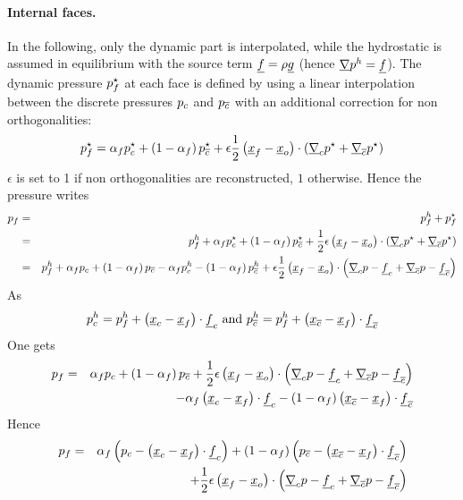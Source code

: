 \paragraph{Internal faces.} In the following, only the dynamic part is
interpolated, while the hydrostatic is assumed in equilibrium with the source
term $\underline{f}=\rho\underline{g}$ (hence $\underline{\nabla} p^h=\underline{f}$). The dynamic pressure
$p_{{f}}^\star$ at each face is defined by using a linear interpolation
between the discrete pressures $p_{c}$ and $p_{{\overline{c}}}$ with an additional
correction for non orthogonalities:
\begin{equation}
	p_{{f}}^\star=\alpha_{{f}}p_{c}^\star+\left(1-\alpha_{{f}}\right)p_{{\overline{c}}}^\star+\epsilon\frac{1}{2}\left(\underline{x}_{{f}}-\underline{x}_o\right)\cdot\left(\underline{\nabla}_{c}{p}^\star+\underline{\nabla}_{{\overline{c}}}{p}^\star\right)
\end{equation}
$\epsilon$ is set to 1 if non orthogonalities are reconstructed, $1$ otherwise.
Hence the pressure writes
\begin{align*}
	p_{{f}}&=&p_{{f}}^{h}+p_{f}^\star \\
	&=&p_{{f}}^{h}+\alpha_{{f}}p_{c}^\star+\left(1-\alpha_{{f}}\right)p_{{\overline{c}}}^\star+\frac{1}{2}\epsilon\left(\underline{x}_{{f}}-\underline{x}_o\right)\cdot\left(\underline{\nabla}_{c}{p}^\star+\underline{\nabla}_{{\overline{c}}}{p}^\star\right) \\
	&=&p_{f}^{h}+\alpha_{{f}}p_{c}+\left(1-\alpha_{{f}}\right)p_{{\overline{c}}}-\alpha_{{f}}p_{c}^{h}-\left(1-\alpha_{{f}}\right)p_{{\overline{c}}}^{h}+\epsilon\frac{1}{2}\left(\underline{x}_{{f}}-\underline{x}_o\right)\cdot\left(\underline{\nabla}_{c}{p}-\underline{f}_{c}+\underline{\nabla}_{{\overline{c}}}{p}-\underline{f}_{{\overline{c}}}\right) \\
\end{align*}
As
\begin{equation}
	p_{c}^{h}=p_{f}^{h}+\left({\underline{x}_{c}}-\underline{x}_{{f}}\right)\cdot\underline{f}_{c} \text{ and }
	p_{{\overline{c}}}^{h}=p_{f}^{h}+\left(\underline{x}_{{\overline{c}}}-\underline{x}_{{f}}\right)\cdot\underline{f}_{{\overline{c}}}
\end{equation}
One gets
\begin{align*}
  p_{f}&=&\alpha_{{f}}p_{c}+\left(1-\alpha_{{f}}\right)p_{{\overline{c}}}+\frac{1}{2}\epsilon\left(\underline{x}_{{f}}-\underline{x}_o\right)\cdot\left(\underline{\nabla}_{c}{p}-\underline{f}_{c}+\underline{\nabla}_{{\overline{c}}}{p}-\underline{f}_{{\overline{c}}}\right) \\ &&-\alpha_{{f}}\left({\underline{x}_{c}}-\underline{x}_{{f}}\right)\cdot\underline{f}_{c}-\left(1-\alpha_{{f}}\right)\left(\underline{x}_{{\overline{c}}}-\underline{x}_{{f}}\right)\cdot\underline{f}_{{\overline{c}}}
\end{align*}
Hence
\begin{align*}
  p_{f}&=&\alpha_{{f}}\left(p_{c}-\left({\underline{x}_{c}}-\underline{x}_{{f}}\right)\cdot\underline{f}_{c}\right)+\left(1-\alpha_{{f}}\right)\left(p_{{\overline{c}}}-\left(\underline{x}_{{\overline{c}}}-\underline{x}_{{f}}\right)\cdot\underline{f}_{{\overline{c}}}\right) \\ &&+\frac{1}{2}\epsilon\left(\underline{x}_{{f}}-\underline{x}_o\right)\cdot\left(\underline{\nabla}_{c}{p}-\underline{f}_{c}+\underline{\nabla}_{{\overline{c}}}{p}-\underline{f}_{{\overline{c}}}\right)
\end{align*}
